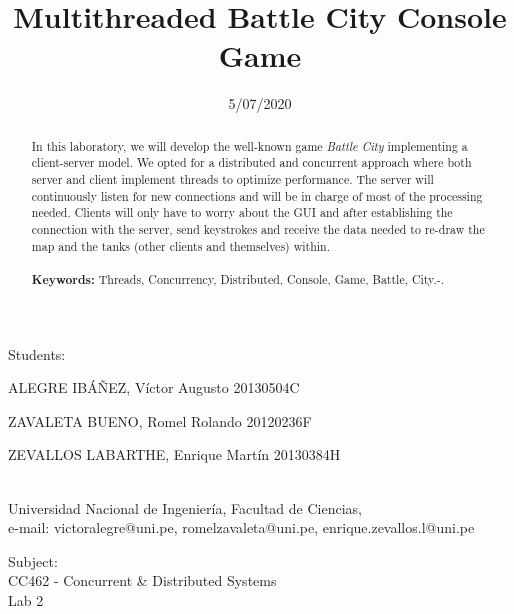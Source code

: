 \documentclass[10pt,a4paper]{article}
\theoremstyle{definition}
\begin{document}
	
\title{Multithreaded Battle City Console Game}
\date{5/07/2020}
\maketitle

\begin{center}
	Students:\\
	\vspace{5pt}
	{\large ALEGRE IBÁÑEZ, Víctor Augusto 20130504C

ZAVALETA BUENO, Romel Rolando 20120236F

ZEVALLOS LABARTHE, Enrique Martín 20130384H}\\
	Universidad Nacional de Ingenier\'ia, Facultad de Ciencias,\\
	e-mail: victoralegre@uni.pe, romelzavaleta@uni.pe, enrique.zevallos.l@uni.pe
	
\end{center}
\vspace{5pt}
\begin{center}
	Subject:\\
	\vspace{5pt}
	{\large CC462 - Concurrent \& Distributed Systems
}\\
	{\large Lab 2}\\
	

	
\end{center}
\vspace{20pt}
\begin{abstract}
{\small
\hspace*{0.5cm}
	In this laboratory, we will develop the well-known game \textit{Battle City} implementing a client-server model. We opted for a distributed and concurrent approach where both server and client implement threads to optimize performance. The server will continuously listen for new connections and will be in charge of most of the processing needed. Clients will only have to worry about the GUI and after establishing the connection with the server, send keystrokes and receive the data needed to re-draw the map and the tanks (other clients and themselves) within.\\\\
\textbf{Keywords:} Threads, Concurrency, Distributed, Console, Game, Battle, City.-.
}
\end{abstract}




\tableofcontents
\end{document}
